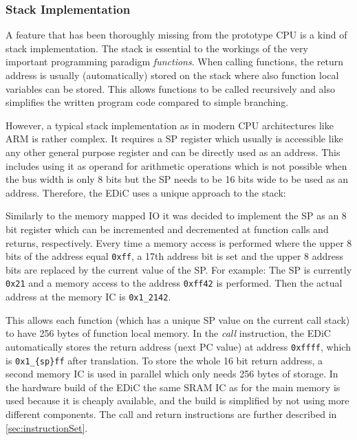 \subsubsection{Stack Implementation}\label{sec:stack}
A feature that has been thoroughly missing from the prototype \gls{CPU} is a kind of stack implementation.
The stack is essential to the workings of the very important programming paradigm \emph{functions}.
When calling functions, the return address is usually (automatically) stored on the stack where also function local variables can be stored.
This allows functions to be called recursively and also simplifies the written program code compared to simple branching.

However, a typical stack implementation as in modern \gls{CPU} architectures like ARM is rather complex.
It requires a \gls{SP} register which usually is accessible like any other general purpose register and can be directly used as an address.
This includes using it as operand for arithmetic operations which is not possible when the bus width is only 8 bits but the \gls{SP} needs to be 16 bits wide to be used as an address.
Therefore, the \gls{EDiC} uses a unique approach to the stack:

Similarly to the memory mapped \gls{IO} it was decided to implement the \gls{SP} as an 8 bit register which can be incremented and decremented at function calls and returns, respectively.
Every time a memory access is performed where the upper 8 bits of the address equal \texttt{0xff}, a 17th address bit is set and the upper 8 address bits are replaced by the current value of the \gls{SP}.
For example: The \gls{SP}  is currently \texttt{0x21} and a memory access to the address \texttt{0xff42} is performed.
Then the actual address at the memory \gls{IC} is \texttt{0x1\_2142}.

This allows each function (which has a unique \gls{SP} value on the current call stack) to have 256 bytes of function local memory.
In the \emph{call} instruction, the \gls{EDiC} automatically stores the return address (next \gls{PC} value) at address \texttt{0xffff}, which is \texttt{0x1\_\{sp\}ff} after translation.
To store the whole 16 bit return address, a second memory \gls{IC} is used in parallel which only needs 256 bytes of storage.
In the hardware build of the \gls{EDiC} the same \gls{SRAM} \gls{IC} as for the main memory is used because it is cheaply available, and the build is simplified by not using more different components.
The call and return instructions are further described in \cref{sec:instructionSet}.


